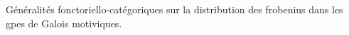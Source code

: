 Généralités fonctoriello-catégoriques sur la distribution des frobenius dans les gpes de Galois motiviques.

